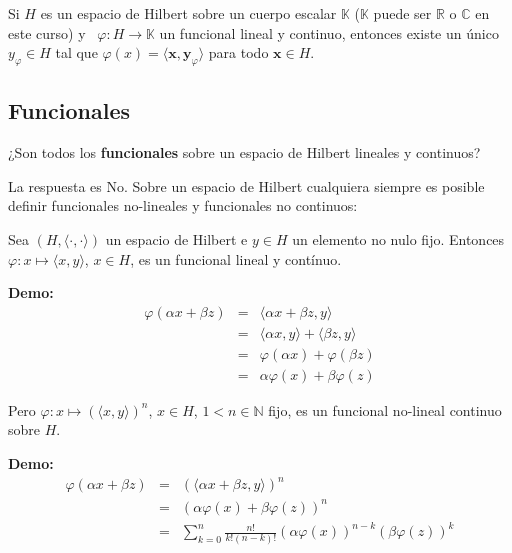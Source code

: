

\begin{myteo}
Si $H$ es un espacio de Hilbert sobre un cuerpo escalar $\mathbb{K}$
($\mathbb{K}$ puede ser $\mathbb{R}$ o $\mathbb{C}$ en este curso)
y \ $\varphi: H \rightarrow \mathbb{K}$ un funcional lineal y continuo,
entonces existe un \'unico $y_{\varphi}\in H$ tal que
$\varphi(x)= \langle \mathbf{x},\mathbf{y}_{\varphi}\rangle$ para todo
$\mathbf{x}\in H$.
\end{myteo}

\subsection{Funcionales} 

¿Son todos los \textbf{funcionales} sobre un espacio de Hilbert
lineales y continuos?

La respuesta es No. Sobre un espacio de Hilbert cualquiera siempre es
posible definir funcionales no-lineales y funcionales no continuos:

Sea $(H,\langle\cdot,\cdot\rangle)$ un espacio de Hilbert e $y\in H$
un elemento no nulo fijo.
Entonces $\varphi: x\mapsto\langle x,y\rangle$, $x\in H$, es un funcional
lineal y contínuo.

\textbf{Demo:} 
\begin{eqnarray*}
\varphi(\alpha x + \beta z) &=& \langle \alpha x + \beta z, y \rangle\\
&=&  \langle \alpha x,y \rangle +   \langle \beta z,y \rangle \\
&=&   \varphi(\alpha x) +  \varphi(\beta z) \\
&=&   \alpha \varphi(x) +  \beta \varphi(z)
\end{eqnarray*}

Pero $\varphi: x\mapsto(\langle x,y\rangle)^n$, $x\in H$, $1<n\in\mathbb{N}$
fijo, es un funcional no-lineal continuo sobre $H$.

\textbf{Demo:} 
\begin{eqnarray*}
\varphi(\alpha x + \beta z) &=& (\langle \alpha x + \beta z, y \rangle)^n\\
&=& (\alpha \varphi(x) +  \beta \varphi(z))^n \\
&=& \displaystyle \sum_{k=0}^n  \frac{n!}{k!(n-k)!} (\alpha \varphi (x))^{n-k} (\beta \varphi(z)) ^k
\end{eqnarray*}


